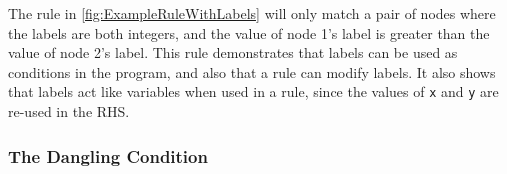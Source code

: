 \documentclass[authoryearcitations]{UoYCSproject}
\begin{document}
The rule in \autoref{fig:ExampleRuleWithLabels} will only match a pair
of nodes where the labels are both integers, and the value of node 1's
label is greater than the value of node 2's label. This rule demonstrates that
labels can be used as conditions in the program, and also that a rule can modify
labels. It also shows that labels act like variables when used in a rule, since
the values of \texttt{x} and \texttt{y} are re-used in the RHS.


\subsubsection{The Dangling Condition}
\label{sec:TheDanglingCondition}
\end{document}

